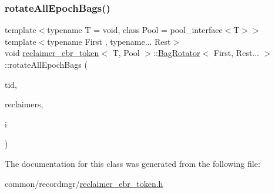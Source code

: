 \subsubsection{\texorpdfstring{rotate\+All\+Epoch\+Bags()}{rotateAllEpochBags()}}
{\footnotesize\ttfamily template$<$typename T  = void, class Pool  = pool\+\_\+interface$<$\+T$>$$>$ \\
template$<$typename First , typename... Rest$>$ \\
void \hyperlink{classreclaimer__ebr__token}{reclaimer\+\_\+ebr\+\_\+token}$<$ T, Pool $>$\+::\hyperlink{classreclaimer__ebr__token_1_1BagRotator}{Bag\+Rotator}$<$ First, Rest... $>$\+::rotate\+All\+Epoch\+Bags (\begin{DoxyParamCaption}\item[{const int}]{tid,  }\item[{void $\ast$const $\ast$const}]{reclaimers,  }\item[{const int}]{i }\end{DoxyParamCaption})\hspace{0.3cm}{\ttfamily [inline]}}



The documentation for this class was generated from the following file\+:\begin{DoxyCompactItemize}
\item 
common/recordmgr/\hyperlink{reclaimer__ebr__token_8h}{reclaimer\+\_\+ebr\+\_\+token.\+h}\end{DoxyCompactItemize}
